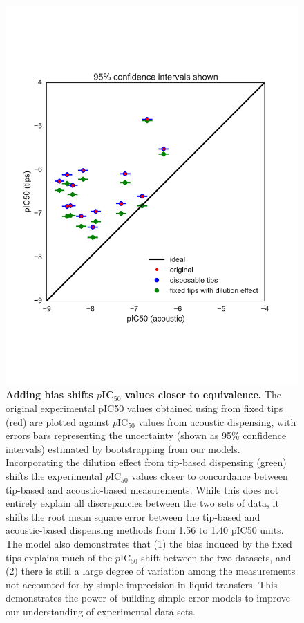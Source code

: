 \documentclass[aps,pre,twocolumn,nofootinbib,superscriptaddress,linenumbers]{revtex4-1}
\begin{document}
\begin{figure}[tb]
    \includegraphics[width=\columnwidth]{../figures/compare-pIC50-bias_corrected.pdf}

  \caption{{\bf Adding bias shifts $p$IC$_{50}$ values closer to equivalence.}
  The original experimental pIC50 values obtained using from fixed tips (red) are plotted against $p$IC$_{50}$ values from acoustic dispensing, with errors bars representing the uncertainty (shown as 95\% confidence intervals) estimated by bootstrapping from our models. 
  Incorporating the dilution effect from tip-based dispensing (green) shifts the experimental $p$IC$_{50}$ values closer to concordance between tip-based and acoustic-based measurements. 
  While this does not entirely explain all discrepancies between the two sets of data, it shifts the root mean square error between the tip-based and acoustic-based dispensing methods from 1.56 to 1.40 pIC50 units.
  The model also demonstrates that (1) the bias induced by the fixed tips explains much of the $p$IC$_{50}$ shift between the two datasets, and (2) there is still a large degree of variation among the measurements not accounted for by simple imprecision in liquid transfers.
  This demonstrates the power of building simple error models to improve our understanding of experimental data sets.
  }
  \label{fig:IC50_bias}
\end{figure}
\end{document}
